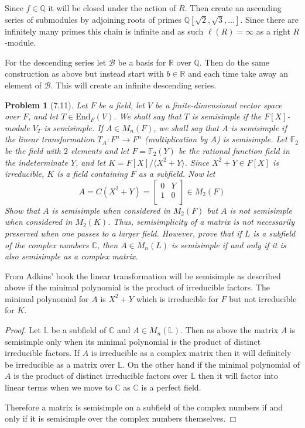 \documentclass[10pt]{article}
\newcommand{\sk}{\vskip 10mm}
\newcommand{\bb}[1]{\mathbb{#1}}
\theoremstyle{plain}
\newtheorem{problem}{Problem}
\theoremstyle{remark}
\begin{document}
Since $f\in\bb{Q}$ it will be closed under the action of $R$.
Then create an ascending series of submodules by
adjoining roots of primes $\bb{Q}[\sqrt{2},\sqrt{3},\ldots]$.
Since there are infinitely many primes this chain is infinite
and as such $\ell(R)=\infty$ as a right $R$-module.

For the descending series let $\mathcal{B}$ be a basis for $\bb{R}$ over
$\bb{Q}$. Then do the same construction as above but instead start with
$b\in \bb{R}$ and each time take away an element of $\mathcal{B}$. This
will create an infinite descending series.

\sk

\begin{problem}[7.11]
  Let $F$ be a field, let $V$ be a finite-dimensional vector space over $F$,
  and let $T\in \text{End}_F(V)$. We shall say that $T$ is semisimple if the
  $F[X]$-module $V_T$ is semisimple. If $A\in M_n(F)$, we shall say that $A$
  is semisimple if the linear transformation $T_A: F^n\rightarrow F^n$
  (multiplication by $A$) is semisimple. Let $\bb{F}_2$ be the field with
  $2$ elements and let $F=\bb{F}_2(Y)$ be the rational function field in
  the indeterminate $Y$, and let $K=F[X]/\langle X^2+Y\rangle$. Since
  $X^2+Y\in F[X]$ is irreducible, $K$ is a field containing
  $F$ as a subfield. Now let
  \[
    A=C(X^2+Y)=
    \left[
      \begin{array}{cc}
        0&Y\\
        1&0\\
      \end{array}
    \right]
    \in M_2(F)
  \]
  Show that $A$ is semisimple when considered in $M_2(F)$ but $A$ is not
  semisimple when considered in $M_2(K)$. Thus, semisimplicity of a matrix
  is not necessarily preserved when one passes to a larger field. However,
  prove that if $L$ is a subfield of the complex numbers $\bb{C}$, then
  $A\in M_n(L)$ is semisimple if and only if it is also semisimple as a complex
  matrix.
\end{problem}

From Adkins' book the linear transformation will be semisimple as
described above if the minimal polynomial is the product of irreducible
factors. The minimal polynomial for $A$ is $X^2+Y$ which is irreducible
for $F$ but not irreducible for $K$.

\begin{proof}
  Let $\bb{L}$ be a subfield of $\bb{C}$ and $A\in M_n(\bb{L})$. Then as
  above the matrix $A$ is semisimple only when its minimal polynomial
  is the product of distinct irreducible factors. If $A$ is irreducible as
  a complex matrix then it will definitely be irreducible as a matrix
  over $\bb{L}$. On the other hand if the minimal polynomial of $A$
  is the product of distinct irreducible factors over $\bb{L}$ then it
  will factor into linear terms when we move to $\bb{C}$ as $\bb{C}$ is
  a perfect field.

  Therefore a matrix is semisimple on a subfield of the complex numbers
  if and only if it is semisimple over the complex numbers themselves.
\end{proof}
\end{document}
